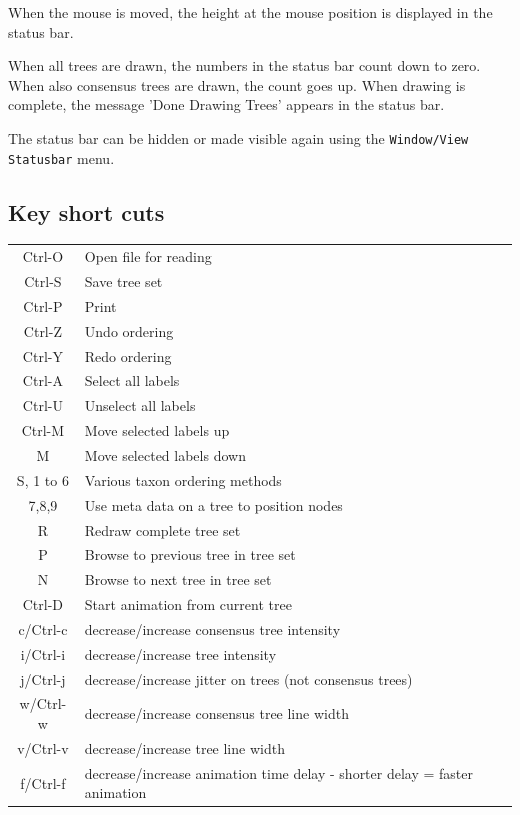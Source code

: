 \documentclass{article}
\begin{document}
When the mouse is moved, the height at the mouse position is displayed in the status bar.

When all trees are drawn, the numbers in the status bar count down to zero. When also
consensus trees are drawn, the count goes up. When drawing is complete, the message 
'Done Drawing Trees' appears in the status bar.

The status bar can be hidden or made visible again using the {\tt Window/View Statusbar} menu.

\newpage
\subsection{Key short cuts}
\begin{center}
\begin{tabular}{|c|l|}
\hline
Ctrl-O & Open file for reading \\
Ctrl-S & Save tree set\\
Ctrl-P & Print \\
\hline
Ctrl-Z & Undo ordering \\
Ctrl-Y & Redo ordering \\
Ctrl-A & Select all labels \\
Ctrl-U & Unselect all labels \\
Ctrl-M & Move selected labels up \\
M & Move selected labels down \\
\hline 
S, 1 to 6 & Various taxon ordering methods \\
7,8,9 & Use meta data on a tree to position nodes\\
\hline
R & Redraw complete tree set \\
\hline
P & Browse to previous tree in tree set \\
N & Browse to next tree in tree set\\
Ctrl-D & Start animation from current tree\\
\hline
c/Ctrl-c &decrease/increase consensus tree intensity\\
i/Ctrl-i &decrease/increase tree intensity\\
j/Ctrl-j &decrease/increase jitter on trees (not consensus trees)\\
w/Ctrl-w &decrease/increase consensus tree line width\\
v/Ctrl-v &decrease/increase tree line width\\
f/Ctrl-f &decrease/increase animation time delay - shorter delay = faster animation\\

\end{tabular}
\end{center}
\end{document}
